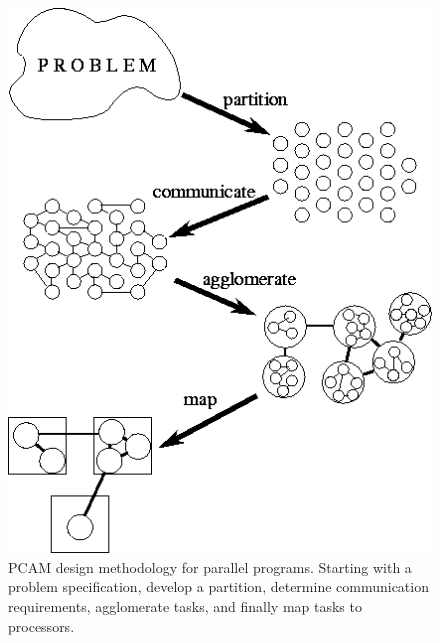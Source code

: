\begin{figure}[!htp]
    \centering
    \includegraphics[width=.5\textwidth]{img/pcam-1.png}
    \caption{PCAM design methodology for parallel programs. Starting with a problem specification, develop a partition, determine communication requirements, agglomerate tasks, and finally map tasks to processors.}
\end{figure}